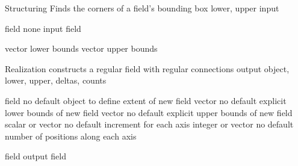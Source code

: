       {Structuring}
      {Finds the corners of a field's bounding box}
      {lower, upper}
      {input}

\begin{ModuleInputs}
          {field}
          {none}
          {input field}{}
\end{ModuleInputs}

\begin{ModuleOutputs}
           {vector}
           {lower bounds}{}
           {vector}
           {upper bounds}{}
\end{ModuleOutputs}





       {Realization}
       {constructs a regular field with regular connections}
       {output}
       {object, lower, upper, deltas, counts}

\begin{ModuleInputs}
          {field}
          {no default}
          {object to define extent of new field}{}
          {vector}
          {no default}
          {explicit lower bounds of new field}{}
          {vector}
          {no default}
          {explicit upper bounds of new field}{}
          {scalar or vector}
          {no default}
          {increment for each axis}{}
          {integer or vector}
          {no default}
          {number of positions along each axis}{}
\end{ModuleInputs}



\begin{ModuleOutputs}
           {field}
           {output field}{}
\end{ModuleOutputs}


